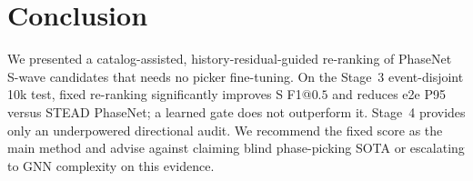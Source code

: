 \section{Conclusion}
\label{sec:conc}

We presented a catalog-assisted, history-residual-guided re-ranking of PhaseNet
S-wave candidates that needs no picker fine-tuning.
On the Stage~3 event-disjoint 10k test, fixed re-ranking significantly improves
S F1@$0.5$ and reduces e2e P95 versus STEAD PhaseNet; a learned gate does not
outperform it.
Stage~4 provides only an underpowered directional audit.
We recommend the fixed score as the main method and advise against claiming
blind phase-picking SOTA or escalating to GNN complexity on this evidence.
